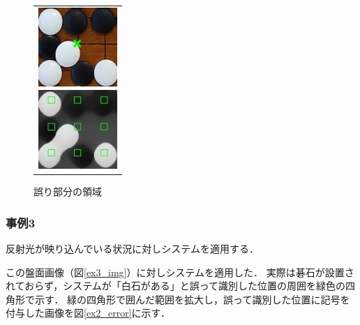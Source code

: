 \documentclass[openright]{nitocs}
\numberwithin{equation}{section}
\begin{document}
                \begin{figure}[tb] %
                    \begin{center}
                      \begin{tabular}{c}
                        \begin{minipage}{0.5\hsize}
                          \begin{center}
                            \includegraphics[clip,width=30mm]{DSC_0099/TRIM_resultCompare.jpg}
                        \caption{図\ref{ex2_img}の誤り部分}
                        \label{ex2_error}
                          \end{center}
                        \end{minipage}
                        \begin{minipage}{0.5\hsize}
                          \begin{center}
                            \includegraphics[clip,width=30mm]{DSC_0099/TRIM_boardWithAreaImg.jpg}
                        \caption{誤り部分の領域}
                        \label{ex2_error_area}
                          \end{center}
                        \end{minipage}
                      \end{tabular}
                    \end{center}
                \end{figure}
    
            \subsubsection{事例3} %
                反射光が映り込んでいる状況に対しシステムを適用する．

                この盤面画像（図\ref{ex3_img}）に対しシステムを適用した．
                実際は碁石が設置されておらず，システムが「白石がある」と誤って識別した位置の周囲を緑色の四角形で示す．
                緑の四角形で囲んだ範囲を拡大し，誤って識別した位置に記号を付与した画像を図\ref{ex2_error}に示す．
\end{document}
